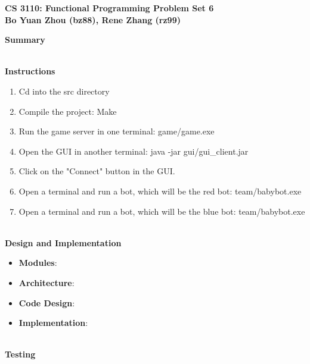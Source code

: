 \documentclass{article}[12pt]
\begin{document}
\begin{framed}
\noindent
\large{\textbf{CS 3110: Functional Programming \hfill Problem Set 6\\Bo Yuan Zhou (bz88), Rene Zhang (rz99)}}
\end{framed}

\noindent
\large{\textbf{Summary}}
\hspace*{\fill}

\hspace*{\fill}\\[\baselineskip]
\Large{\textbf{Instructions}}
\hspace*{\fill}
\begin{enumerate}
	\item Cd into the src directory
	\item Compile the project: Make
	\item Run the game server in one terminal: game/game.exe
	\item Open the GUI in another terminal: java -jar gui/gui\_client.jar
	\item Click on the "Connect" button in the GUI.
	\item Open a terminal and run a bot, which will be the red bot: team/babybot.exe
	\item Open a terminal and run a bot, which will be the blue bot: team/babybot.exe
\end{enumerate}
\hspace*{\fill}\\
\Large{\textbf{Design and Implementation}}
\hspace*{\fill}
\begin{itemize}
	\item \large{\textbf{Modules}}: 
	\item \large{\textbf{Architecture}}: 
	\item \large{\textbf{Code Design}}: 
	\item \large{\textbf{Implementation}}: 
\end{itemize}
\hspace*{\fill}\\
\Large{\textbf{Testing}}
\hspace*{\fill}
\end{document}
